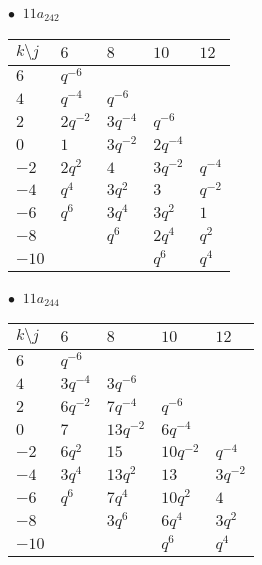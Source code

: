 \begin{minipage}{\linewidth}
$\bullet\ $ $11a_{242}$ \vspace{0.5em} \\
\begin{tabular}{l|llll}
$k \setminus j$ & $6$ & $8$ & $10$ & $12$ \\
\hline
$6$ & $q^{-6}$ &  &  &  \\
$4$ & $q^{-4}$ & $q^{-6}$ &  &  \\
$2$ & $2q^{-2}$ & $3q^{-4}$ & $q^{-6}$ &  \\
$0$ & $1$ & $3q^{-2}$ & $2q^{-4}$ &  \\
$-2$ & $2q^{2}$ & $4$ & $3q^{-2}$ & $q^{-4}$ \\
$-4$ & $q^{4}$ & $3q^{2}$ & $3$ & $q^{-2}$ \\
$-6$ & $q^{6}$ & $3q^{4}$ & $3q^{2}$ & $1$ \\
$-8$ &  & $q^{6}$ & $2q^{4}$ & $q^{2}$ \\
$-10$ &  &  & $q^{6}$ & $q^{4}$ \\
\end{tabular}
\vspace{2em}
\end{minipage}
%
\begin{minipage}{\linewidth}
$\bullet\ $ $11a_{244}$ \vspace{0.5em} \\
\begin{tabular}{l|llll}
$k \setminus j$ & $6$ & $8$ & $10$ & $12$ \\
\hline
$6$ & $q^{-6}$ &  &  &  \\
$4$ & $3q^{-4}$ & $3q^{-6}$ &  &  \\
$2$ & $6q^{-2}$ & $7q^{-4}$ & $q^{-6}$ &  \\
$0$ & $7$ & $13q^{-2}$ & $6q^{-4}$ &  \\
$-2$ & $6q^{2}$ & $15$ & $10q^{-2}$ & $q^{-4}$ \\
$-4$ & $3q^{4}$ & $13q^{2}$ & $13$ & $3q^{-2}$ \\
$-6$ & $q^{6}$ & $7q^{4}$ & $10q^{2}$ & $4$ \\
$-8$ &  & $3q^{6}$ & $6q^{4}$ & $3q^{2}$ \\
$-10$ &  &  & $q^{6}$ & $q^{4}$ \\
\end{tabular}
\vspace{2em}
\end{minipage}
%
